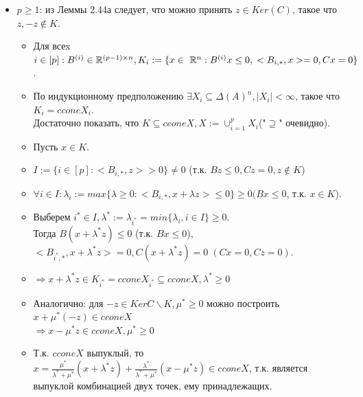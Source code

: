 \begin{itemize}
\item $p\geq1$: из Леммы 2.44а следует, что можно принять $z\in Ker(C)$, такое что $z,-z\notin K$.
\begin{itemize}
\item Для всеx $i\in [p]: B^{(i)} \in \mathbb{R}^{(p-1)\times n}, K_{i}:=\{x\in\ \mathbb{R}^{n}:B^{(i)}x\leq0, \\<B_{i,\ast},x>=0,Cx=0\}$.
\end{itemize}
\begin{itemize}
\item По индукционному предположению $\exists X_{i}\subseteq \Delta(A)^{n},|X_{i}|<\infty$, такое что $K_{i}=ccone X_{i}$.\\
Достаточно показать, что $K\subseteq cconeX, X:=\cup_{i=1}^p X_{i}$("$\supseteq$" очевидно).
\end{itemize}
\begin{itemize}
\item Пусть $x\in K$.
\end{itemize}
\begin{itemize}
\item $I:=\{i\in[p]: <B_{i,\ast},z> >0\}\neq0$ (т.к. $Bz\leq0, Cz=0, z\notin K$)
\end{itemize}
\begin{itemize}
\item $\forall i\in I: \lambda_{i}:=max\{\lambda\geq0: <B_{i,\ast},x+\lambda z>\leq0\}\geq0 (Bx\leq0$, т.к. $x\in K$).
\end{itemize}
\begin{itemize}
\item Выберем $i^{\ast}\in I, \lambda^{\ast}:=\lambda_{i^{\ast}}=min\{\lambda_{i},i\in I\}\geq0$.\\
Тогда $B(x+\lambda^{\ast}z)\leq0$ (т.к. $Bx\leq0$), $<B_{i^{\ast},\ast},x+\lambda^{\ast}z>=0, C(x+\lambda^{\ast}z)=0\;(Cx=0,Cz=0)$.
\end{itemize}
\begin{itemize}
\item $\Longrightarrow x+\lambda^{\ast}z \in K_{i^{\ast}}=ccone X_{i^{\ast}}\subseteq ccone X, \lambda^{\ast}\geq0$
\end{itemize}
\begin{itemize}
\item Аналогично: для $-z \in Ker C\backslash K, \mu^{\ast}\geq0$ можно построить $x+\mu^{\ast}(-z) \in ccone X$\\
$\Longrightarrow x-\mu^{\ast}z \in ccone X, \mu^{\ast}\geq0$
\end{itemize}
\begin{itemize}
\item Т.к. $ccone X$ выпуклый, то \\
$x=\frac{\mu^{\ast}}{\lambda^{\ast} + \mu^{\ast}}(x+\lambda^{\ast}z)+\frac{\lambda^{\ast}}{\lambda^{\ast}+\mu^{\ast}}(x-\mu^{\ast}z) \in ccone X$, т.к. является выпуклой комбинацией двух точек, ему принадлежащих.
\end{itemize}
\end{itemize}
